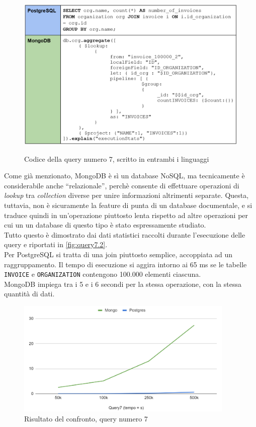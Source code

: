 \begin{figure}[htbp]
\begin{center}
\includegraphics[height=22em]{immagini/query/query7.png}
\caption{Codice della query numero 7, scritto in entrambi i linguaggi}
\label{fig:query7}
\end{center}
\end{figure}

\noindent Come già menzionato, MongoDB è sì un database NoSQL, ma tecnicamente è considerabile anche ``relazionale'', perchè consente di effettuare operazioni di \textit{lookup} tra \textit{collection} diverse per unire informazioni altrimenti separate. Questa, tuttavia, non è sicuramente la feature di punta di un database documentale, e si traduce quindi in un'operazione piuttosto lenta rispetto ad altre operazioni per cui un un database di questo tipo è stato espressamente studiato.\\

\noindent Tutto questo è dimostrato dai dati statistici raccolti durante l'esecuzione delle query e riportati in \autoref{fig:query7.2}.\\
Per PostgreSQL si tratta di una join piuttosto semplice, accoppiata ad un raggruppamento. Il tempo di esecuzione si aggira intorno ai 65 ms se le tabelle \texttt{INVOICE} e \texttt{ORGANIZATION} contengono 100.000 elementi ciascuna.\\
MongoDB impiega tra i 5 e i 6 secondi per la stessa operazione, con la stessa quantità di dati.\\

\begin{figure}[htbp]
\begin{center}
\includegraphics[height=15em]{immagini/query/query7_results.png}
\caption{Risultato del confronto, query numero 7}
\label{fig:query7.2}
\end{center}
\end{figure}

